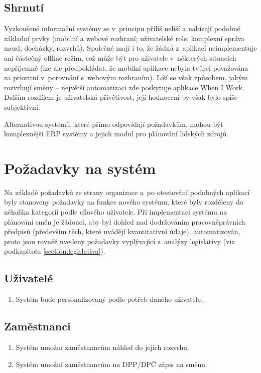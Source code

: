 \documentclass[twoside]{ctuthesis}
\begin{document}
\subsection{Shrnutí}
Vyzkoušené informační systémy se v~principu příliš neliší a nabízejí podobné základní prvky (mobilní a webové rozhraní; uživatelské role; komplexní správa mezd, docházky, rozvrhů). Společné mají i to, že žádná z~aplikací neimplementuje ani částečný offline režim, což může být pro uživatele v~některých situacích nepříjemné (lze ale předpokládat, že mobilní aplikace nebyla tvůrci považována za prioritní v~porovnání s~webovým rozhraním). Liší se však způsobem, jakým rozvrhují směny -- největší automatizaci zde poskytuje aplikace When I Work. Dalším rozdílem je uživatelská přívětivost, její hodnocení by však bylo spíše subjektivní.

Alternativou systémů, které přímo odpovídají požadavkům, mohou být komplexnější ERP systémy a jejich modul pro plánování lidských zdrojů.

\section{Požadavky na systém}
Na základě požadavků ze strany organizace a~po otestování podobných aplikací byly stanoveny požadavky na funkce nového systému, které byly rozděleny do několika kategorií podle cílového uživatele. Při implementaci systému na plánování směn je žádoucí, aby byl dohled nad dodržováním pracovněprávních předpisů (především těch, které uvádějí kvantitativní údaje), automatizován, proto jsou rovněž uvedeny požadavky vyplývající z~analýzy legislativy (viz podkapitolu \ref{section:legislativa}).

\subsection{Uživatelé}
\begin{enumerate}[label=\textbf{U\arabic*.}]
		\item Systém bude personalizovaný podle potřeb daného uživatele.
\end{enumerate}

\subsection{Zaměstnanci}
\begin{enumerate}[label=\textbf{Z\arabic*.}]
		\item Systém umožní zaměstnancům náhled do jejich rozvrhu.
		\item Systém umožní zaměstnancům na DPP/DPČ zápis na směnu.
\end{enumerate}
\end{document}
